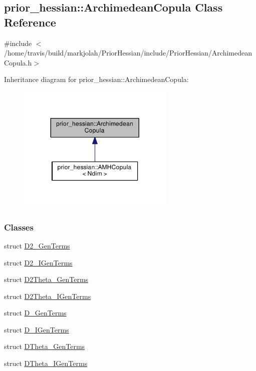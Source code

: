 \hypertarget{classprior__hessian_1_1ArchimedeanCopula}{}\subsection{prior\+\_\+hessian\+:\+:Archimedean\+Copula Class Reference}
\label{classprior__hessian_1_1ArchimedeanCopula}


{\ttfamily \#include $<$/home/travis/build/markjolah/\+Prior\+Hessian/include/\+Prior\+Hessian/\+Archimedean\+Copula.\+h$>$}



Inheritance diagram for prior\+\_\+hessian\+:\+:Archimedean\+Copula\+:\nopagebreak
\begin{figure}[H]
\begin{center}
\leavevmode
\includegraphics[width=212pt]{classprior__hessian_1_1ArchimedeanCopula__inherit__graph}
\end{center}
\end{figure}
\subsubsection*{Classes}
\begin{DoxyCompactItemize}
\item 
struct \hyperlink{structprior__hessian_1_1ArchimedeanCopula_1_1D2__GenTerms}{D2\+\_\+\+Gen\+Terms}
\item 
struct \hyperlink{structprior__hessian_1_1ArchimedeanCopula_1_1D2__IGenTerms}{D2\+\_\+\+I\+Gen\+Terms}
\item 
struct \hyperlink{structprior__hessian_1_1ArchimedeanCopula_1_1D2Theta__GenTerms}{D2\+Theta\+\_\+\+Gen\+Terms}
\item 
struct \hyperlink{structprior__hessian_1_1ArchimedeanCopula_1_1D2Theta__IGenTerms}{D2\+Theta\+\_\+\+I\+Gen\+Terms}
\item 
struct \hyperlink{structprior__hessian_1_1ArchimedeanCopula_1_1D__GenTerms}{D\+\_\+\+Gen\+Terms}
\item 
struct \hyperlink{structprior__hessian_1_1ArchimedeanCopula_1_1D__IGenTerms}{D\+\_\+\+I\+Gen\+Terms}
\item 
struct \hyperlink{structprior__hessian_1_1ArchimedeanCopula_1_1DTheta__GenTerms}{D\+Theta\+\_\+\+Gen\+Terms}
\item 
struct \hyperlink{structprior__hessian_1_1ArchimedeanCopula_1_1DTheta__IGenTerms}{D\+Theta\+\_\+\+I\+Gen\+Terms}
\end{DoxyCompactItemize}


